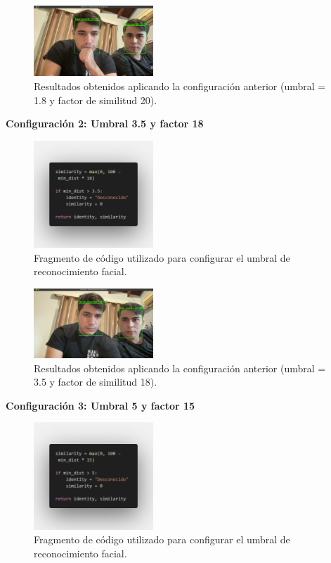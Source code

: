 \documentclass[10pt,a4paper]{article}
\begin{document}
\begin{multicols}{2}
\begin{figure}[H]
    \centering
    \includegraphics[width=0.4\textwidth]{imagenes/umbral1.8min_dist20.jpg}
    \caption{Resultados obtenidos aplicando la configuración anterior (umbral = 1.8 y factor de similitud 20).}
\end{figure}


\textbf{Configuración 2: Umbral 3.5 y factor 18}

\begin{figure}[H]
    \centering
    \includegraphics[width=0.4\textwidth]{imagenes/4.png}
    \caption{Fragmento de código utilizado para configurar el umbral de reconocimiento facial.}
\end{figure}
\vspace{-0.5cm}

\begin{figure}[H]
    \centering
    \includegraphics[width=0.4\textwidth]{imagenes/4.4.jpg}
    \caption{Resultados obtenidos aplicando la configuración anterior (umbral = 3.5 y factor de similitud 18).}
\end{figure}




\textbf{Configuración 3: Umbral 5 y factor 15}

\begin{figure}[H]
    \centering
    \includegraphics[width=0.4\textwidth]{imagenes/5.png}
    \caption{Fragmento de código utilizado para configurar el umbral de reconocimiento facial.}
\end{figure}
\vspace{-0.5cm}


\end{multicols}
\end{document}
